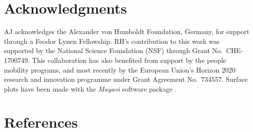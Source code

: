 \documentclass{elsarticle}
\def\EDITS#1{{\color{green}#1}}
\def\EDITS#1{#1}
\def\EDITS#1{{\color{mygreen}#1}}
\begin{document}
\section*{Acknowledgments}
AJ acknowledges the Alexander von Humboldt Foundation, Germany, 
for support through a Feodor Lynen Fellowship.
RH's contribution to this work was supported by 
the National Science Foundation (NSF) through Grant 
No.~CHE-1700749.
This collaboration has also benefited from support
by the people mobility programs, and most recently by the
European Union’s Horizon 2020 research and innovation
programme under Grant Agreement No.~734557.
\EDITS{Surface} plots 
\EDITS{have been} made with the \emph{Mayavi} software 
package \cite{ramachandran2011mayavi}.



\section*{References}

\end{document}
